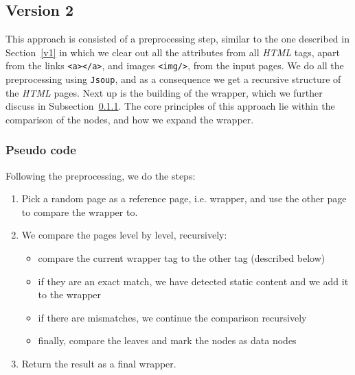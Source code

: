 \documentclass{article}
\begin{document}
	\subsection{Version 2}\label{v2}
	This approach is consisted of a preprocessing step, similar to the one described in Section~\ref{v1}  in which we clear out all the attributes from all \textit{HTML} tags, apart from the links \texttt{<a></a>}, and images \texttt{<img/>}, from the input pages. We do all the preprocessing using \texttt{Jsoup}, and as a consequence we get a recursive structure of the \textit{HTML} pages. Next up is the building of the wrapper, which we further discuss in Subsection~\ref{v2-pseudo}. The core principles of this approach lie within the comparison of the nodes, and how we expand the wrapper.
	
	\subsubsection{Pseudo code} \label{v2-pseudo}
	Following the preprocessing, we do the  steps:
	\begin{enumerate}
		\item Pick a random page as a reference page, i.e. wrapper, and use the other page to compare the wrapper to.
		\item We compare the pages level by level, recursively:
		\begin{itemize}
			\item compare the current wrapper tag to the other tag (described below)
			\item if they are an exact match, we have detected static content and we add it to the wrapper
			\item if there are mismatches, we continue the comparison recursively
			\item finally, compare the leaves and mark the nodes as data nodes
		\end{itemize}
		\item Return the result as a final wrapper.
	\end{enumerate}
	
\end{document}
